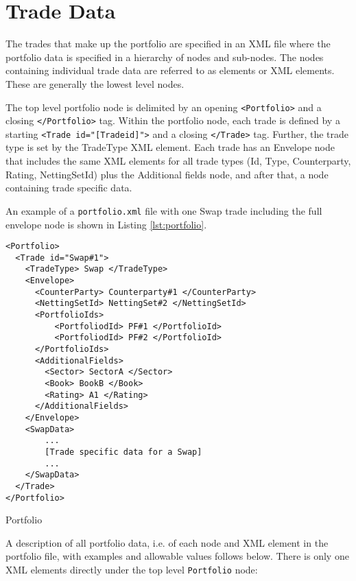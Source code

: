 \section{Trade Data}\label{sec:portfolio_data}

The trades that make up the portfolio are specified in an XML file where the portfolio data is specified in a hierarchy
of nodes and sub-nodes.  The nodes containing individual trade data are referred to as elements or XML elements. These
are generally the lowest level nodes.

\medskip

The top level portfolio node is delimited by an opening {\tt <Portfolio>} and a closing {\tt </Portfolio>} tag. Within
the portfolio node, each trade is defined by a starting {\tt <Trade id="[Tradeid]">} and a closing {\tt </Trade>} tag.
Further, the trade type is set by the TradeType XML element. Each trade has an Envelope node that includes the same XML
elements for all trade types (Id, Type, Counterparty, Rating, NettingSetId) plus the Additional fields node, and after
that, a node containing trade specific data.

\vspace{1em}
An example of a {\tt portfolio.xml} file with one Swap trade including the full envelope node is shown in Listing \ref{lst:portfolio}.

\begin{listing}[H]
\begin{verbatim}
<Portfolio>
  <Trade id="Swap#1">
    <TradeType> Swap </TradeType>
    <Envelope>
      <CounterParty> Counterparty#1 </CounterParty>
      <NettingSetId> NettingSet#2 </NettingSetId>
      <PortfolioIds>
          <PortfoliodId> PF#1 </PortfolioId>
          <PortfoliodId> PF#2 </PortfolioId>
      </PortfolioIds>
      <AdditionalFields>
        <Sector> SectorA </Sector>
        <Book> BookB </Book>
        <Rating> A1 </Rating>
      </AdditionalFields>
    </Envelope>
    <SwapData>
        ...
        [Trade specific data for a Swap]
        ...
    </SwapData>
  </Trade>
</Portfolio>
\end{verbatim}
\caption{Portfolio}
\label{lst:portfolio}
\end{listing}

A description of all portfolio data, i.e. of each node and XML element in the portfolio file, with examples and
allowable values follows below. There is only one XML elements directly under the top level {\tt Portfolio} node:


